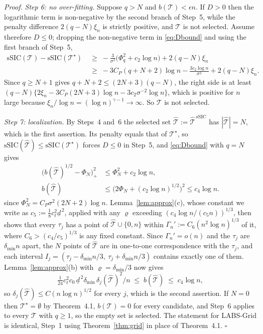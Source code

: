 \documentclass[12pt, a4paper]{article}
\newcommand{\qed}{\hfill$\square$}
\newenvironment{proof}[1][Proof]{\par\noindent\textit{#1.}\space}{\qed\par\medskip}
\newcommand{\mainthm}{Theorem~4.1}
\begin{document}
\begin{proof}
\medskip
\noindent\emph{Step 6: no over-fitting.} Suppose $q > N$ and $b(\mathcal{T}) < \epsilon n$. If $D > 0$ then the logarithmic term is non-negative by the second branch of Step~5, while the penalty difference $2(q-N)\xi_n$ is strictly positive, and $\mathcal{T}$ is not selected. Assume therefore $D \le 0$; dropping the non-negative term in \eqref{eq:Dbound} and using the first branch of Step~5,
\begin{align*}
\mathrm{sSIC}(\mathcal{T}) - \mathrm{sSIC}(\mathcal{T}^\star)
&\;\ge\; -\frac{3}{\sigma^2}\big( \Phi_q^2 + c_2\log n \big) + 2(q-N)\xi_n \\
&\;\ge\; -3C_P(q+N+2)\log n - \frac{3c_2\log n}{\sigma^2} + 2(q-N)\xi_n .
\end{align*}
Since $q \ge N+1$ gives $q + N + 2 \le (2N+3)(q-N)$, the right side is at least $(q-N)\{2\xi_n - 3C_P(2N+3)\log n - 3c_2\sigma^{-2}\log n\}$, which is positive
for $n$ large because $\xi_n/\log n = (\log n)^{\gamma-1} \to \infty$. So
$\mathcal{T}$ is not selected.

\medskip
\noindent\emph{Step 7: localization.} By Steps~4 and~6 the selected set
$\hat{\mathcal{T}} := \hat{\mathcal{T}}^{\,\mathrm{sSIC}}$ has
$|\hat{\mathcal{T}}| = N$, which is the first assertion. Its penalty equals
that of $\mathcal{T}^\star$, so
$\mathrm{sSIC}(\hat{\mathcal{T}}) \le \mathrm{sSIC}(\mathcal{T}^\star)$ forces
$D \le 0$ in Step~5, and \eqref{eq:Dbound} with $q = N$ gives
\[
\begin{aligned}
\big( b(\hat{\mathcal{T}})^{1/2} - \Phi_N \big)_+^2
&\le \Phi_N^2 + c_2\log n, \\
b(\hat{\mathcal{T}})
&\le \big( 2\Phi_N + (c_2\log n)^{1/2} \big)^2
\le c_4 \log n.
\end{aligned}
\]
since $\Phi_N^2 = C_P\sigma^2(2N+2)\log n$. Lemma~\ref{lem:approx}(c), whose constant we write as $c_5 := \tfrac18 c_\ell^2 \underline d^{\,2}$, applied with any $\varrho$ exceeding $(c_4\log n/(c_5n))^{1/3}$, then shows that every $\tau_j$ has a point of $\hat{\mathcal{T}} \cup \{0,n\}$ within $\Gamma_n' := C_6 (n^2\log n)^{1/3}$ of it, where $C_6 > (c_4/c_5)^{1/3}$ is any fixed constant. Since $\Gamma_n' = o(n)$ and the $\tau_j$ are $\delta_{\min}n$ apart, the
$N$ points of $\hat{\mathcal{T}}$ are in one-to-one correspondence with the
$\tau_j$, and each interval $I_j = (\tau_j - \delta_{\min}n/3,\ \tau_j +
\delta_{\min}n/3)$ contains exactly one of them. Lemma~\ref{lem:approx}(b) with
$\varrho = \delta_{\min}/3$ now gives
\[
\tfrac{1}{24} c_\ell^2 c_0\, \underline d^{\,2}\delta_{\min}\, \delta_j(\hat{\mathcal{T}})^2 / n \;\le\; b(\hat{\mathcal{T}}) \;\le\; c_4 \log n ,
\]
so $\delta_j(\hat{\mathcal{T}}) \le C (n\log n)^{1/2}$ for every $j$, which is
the second assertion. If $N = 0$ then $\mathcal{T}^\star = \emptyset$ by \mainthm{}, $b(\mathcal{T}) = 0$ for every candidate, and Step~6 applies to every $\mathcal{T}$ with $q \ge 1$, so the empty set is selected. The statement for LABS-Grid is identical, Step~1 using Theorem~\ref{thm:grid} in place of \mainthm{}.
\end{proof}
\end{document}

